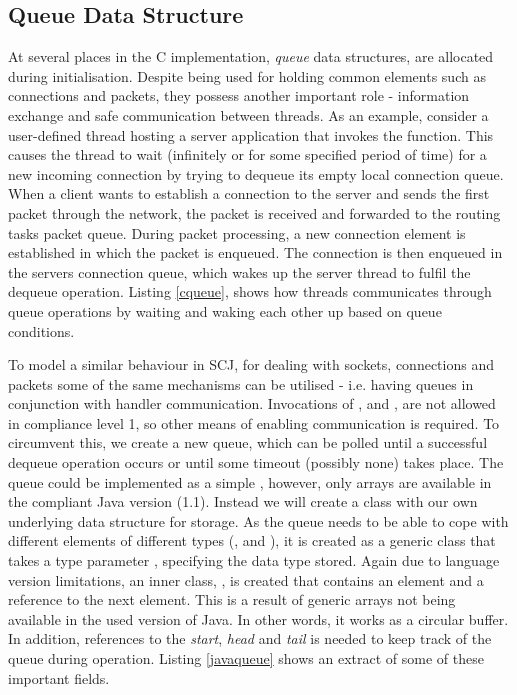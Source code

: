 \subsection{Queue Data Structure} %
\label{sub:queue}
At several places in the C implementation, \textit{queue} data structures, are allocated during initialisation. Despite being used for holding common elements such as connections and packets, they possess another important role - information exchange and safe communication between threads. As an example, consider a user-defined thread hosting a server application that invokes the  function. This causes the thread to wait (infinitely or for some specified period of time) for a new incoming connection by trying to dequeue its empty local connection queue. When a client wants to establish a connection to the server and sends the first packet through the network, the packet is received and forwarded to the routing tasks packet queue. During packet processing, a new connection element is established in which the packet is enqueued. The connection is then enqueued in the servers connection queue, which wakes up the server thread to fulfil the dequeue operation. Listing \ref{cqueue}, shows how threads communicates through queue operations by waiting and waking each other up based on queue conditions.



To model a similar behaviour in SCJ, for dealing with sockets, connections and packets some of the same mechanisms can be utilised - i.e. having queues in conjunction with handler communication. Invocations of ,  and , are not allowed in compliance level 1, so other means of enabling communication is required. To circumvent this, we create a new queue, which can be polled until a successful dequeue operation occurs or until some timeout (possibly none) takes place. The queue could be implemented as a simple , however, only arrays are available in the compliant Java version (1.1). Instead we will create a  class with our own underlying data structure for storage. As the queue needs to be able to cope with different elements of different types (,  and ), it is created as a generic class that takes a type parameter , specifying the data type stored. Again due to language version limitations, an inner class, , is created that contains an element and a reference to the next element. This is a result of generic arrays not being available in the used version of Java. In other words, it works as a circular buffer. In addition, references to the \textit{start}, \textit{head} and \textit{tail} is needed to keep track of the queue during operation. Listing \ref{javaqueue} shows an extract of some of these important fields.


